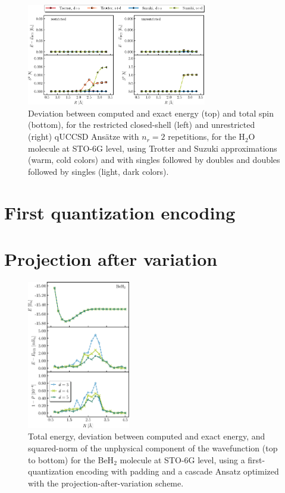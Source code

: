 \documentclass[aps,pra,twocolumn]{revtex4-2}
\begin{document}
\begin{figure}[t!]
\includegraphics[width=0.7\textwidth]{../figures/qUCCSD_flavors/quccsd_reps_2.eps}
\caption{Deviation between computed and exact energy (top) and total spin (bottom), for the restricted closed-shell (left) and unrestricted (right) qUCCSD Ans\"{a}tze with $n_r=2$ repetitions, for the H$_2$O molecule at STO-6G level, using Trotter and Suzuki approximations (warm, cold colors) and with singles followed by doubles and doubles followed by singles (light, dark colors).}
\label{figure:quccsd_reps_2}
\end{figure} 

\section{First quantization encoding}
\label{sec:first}

\section{Projection after variation}
\label{sec:pav}

\begin{figure}[t!]
\includegraphics[width=0.4\textwidth]{../figures/first_quantization_pad_pav/first_quantization_pad_pav.eps}
\caption{Total energy, deviation between computed and exact energy, and squared-norm of the unphysical component of the wavefunction
(top to bottom) for the BeH$_2$ molecule at STO-6G level, 
using a first-quantization encoding with padding and a cascade Ansatz optimized with the projection-after-variation scheme.}
\label{figure:pad_pav}
\end{figure} 
\end{document}
